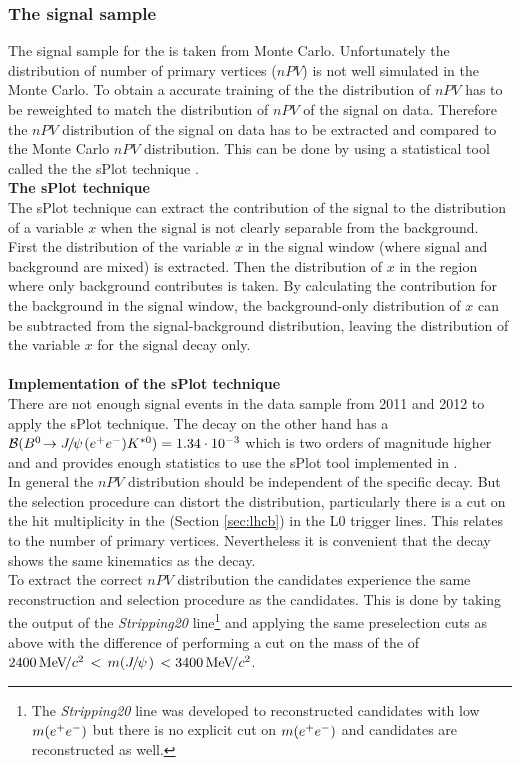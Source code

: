 \subsubsection{The \BdKstee signal sample}
\label{sec:splot}
The signal sample for the \bdtn is taken from \BdKstee Monte Carlo. Unfortunately the distribution of number of primary vertices ($nPV$) is not well simulated in the Monte Carlo. To obtain a accurate training of the \bdtn the distribution of $nPV$ has to be reweighted to match the distribution of $nPV$ of the \BdKstee signal on \lhcb data. Therefore the $nPV$ distribution of the signal on \lhcb data has to be extracted and compared to the Monte Carlo $nPV$ distribution. This can be done by using a statistical tool called the the sPlot technique \cite{splot}. \\
\newpage
\textbf{The sPlot technique}\\
The sPlot technique can extract the contribution of the signal to the distribution of a variable $x$ when the signal is not clearly separable from the background. First the distribution of the variable $x$ in the signal window (where signal and background are mixed) is extracted. Then the distribution of $x$ in the region where only background contributes is taken. By calculating the contribution for the background in the signal window, the background-only distribution of $x$ can be subtracted from the signal-background distribution, leaving the distribution of the variable $x$ for the signal decay only.\\
\\
\textbf{Implementation of the sPlot technique}\\
There are not enough signal events in the \BdKstee data sample from 2011 and 2012 to apply the sPlot technique. The \BdToJPsieeKst decay on the other hand has a $ \BR(\BdToJPsieeKst) = 1.34 \cdot 10^{-3} $ which is two orders of magnitude higher and and provides enough statistics to use the sPlot tool implemented in \root.\\
In general the $nPV$ distribution should be independent of the specific decay. But the selection procedure can distort the distribution, particularly there is a cut on the hit multiplicity in the \spd (Section \ref{sec:lhcb}) in the L0 trigger lines. This relates to the number of primary vertices. Nevertheless it is convenient that the \BdToJPsieeKst decay shows the same kinematics as the \BdKstee decay.\\
To extract the correct $nPV$ distribution the \BdToJPsieeKst candidates experience the same reconstruction and selection procedure as the \BdKstee candidates. This is done by taking the output of the \BdKstee \textit{Stripping20} line\footnote{The \BdKstee \textit{Stripping20} line was developed to reconstructed \BdKstee candidates with low $m(e^+e^-)$ but there is no explicit cut on $m(e^+e^-)$ and \BdToJPsieeKst candidates are reconstructed as well.} and applying the same preselection cuts as above with the difference of performing a cut on the mass of the \jpsi of $2400 {\mathrm{\,Me\kern -0.1em V\!/}c^2} \, < \, m({J\mskip -3mu/\mskip -2mu\psi\mskip 2mu}) \, < 3400 {\mathrm{\,Me\kern -0.1em V\!/}c^2} $.\\
